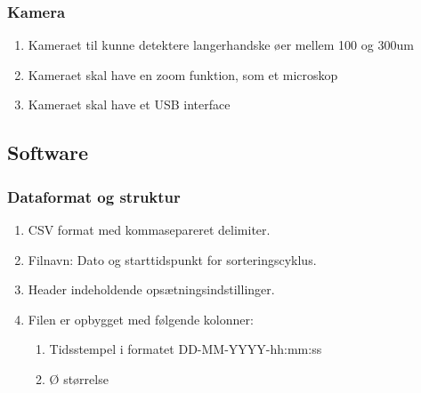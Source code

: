 \subsubsection{Kamera} \label{subsub:camera}
\begin{enumerate}
\item Kameraet til kunne detektere langerhandske øer mellem 100 og 300um
\item Kameraet skal have en zoom funktion, som et microskop
\item Kameraet skal have et USB interface
\end{enumerate}


\subsection{Software} 

\subsubsection{Dataformat og struktur} \label{subsub:software}
\begin{enumerate}
\item CSV format med kommasepareret delimiter. 
\item Filnavn: Dato og starttidspunkt for sorteringscyklus.
\item Header indeholdende opsætningsindstillinger.
\item Filen er opbygget med følgende kolonner: 
\begin{enumerate}
\item Tidsstempel i formatet DD-MM-YYYY-hh:mm:ss
\item Ø størrelse
\end{enumerate}
\end{enumerate}

